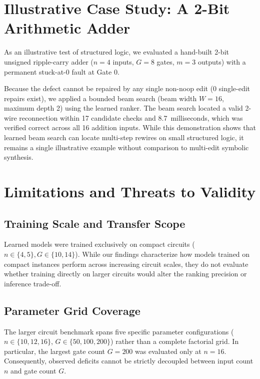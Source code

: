 \documentclass[11pt]{article}
\begin{document}
\section{Illustrative Case Study: A 2-Bit Arithmetic Adder}
As an illustrative test of structured logic, we evaluated a hand-built 2-bit unsigned ripple-carry adder ($n=4$ inputs, $G=8$ gates, $m=3$ outputs) with a permanent stuck-at-0 fault at Gate 0. 

Because the defect cannot be repaired by any single non-noop edit (0 single-edit repairs exist), we applied a bounded beam search (beam width $W=16$, maximum depth 2) using the learned ranker. The beam search located a valid 2-wire reconnection within 17 candidate checks and 8.7~milliseconds, which was verified correct across all 16 addition inputs. While this demonstration shows that learned beam search can locate multi-step rewires on small structured logic, it remains a single illustrative example without comparison to multi-edit symbolic synthesis.

\section{Limitations and Threats to Validity}

\subsection{Training Scale and Transfer Scope}
Learned models were trained exclusively on compact circuits ($n \in \{4, 5\}, G \in \{10, 14\}$). While our findings characterize how models trained on compact instances perform across increasing circuit scales, they do not evaluate whether training directly on larger circuits would alter the ranking precision or inference trade-off.

\subsection{Parameter Grid Coverage}
The larger circuit benchmark spans five specific parameter configurations ($n \in \{10, 12, 16\}$, $G \in \{50, 100, 200\}$) rather than a complete factorial grid. In particular, the largest gate count $G=200$ was evaluated only at $n=16$. Consequently, observed deficits cannot be strictly decoupled between input count $n$ and gate count $G$.
\end{document}
